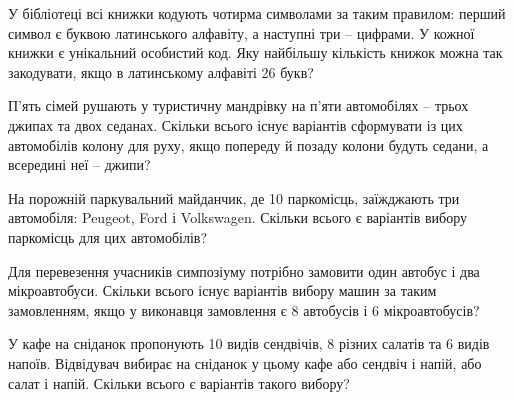 \documentclass[12pt]{article}
\begin{document}
\begin{samepage}
\noindent\zadnum У бібліотеці всі книжки кодують чотирма символами за таким правилом: перший символ є буквою латинського алфавіту, а наступні три – цифрами. У кожної книжки є унікальний особистий код. Яку найбільшу кількість книжок можна так закодувати, якщо в латинському алфавіті 26 букв? 

\nmtnobreak
\nopagebreak\nbvspace{0.5cm}
\nmtAnswerBox
\par{}
\end{samepage}

\begin{samepage}
\noindent\zadnum П'ять сімей рушають у туристичну мандрівку на п'яти автомобілях – трьох джипах та двох седанах. Скільки всього існує варіантів сформувати із цих автомобілів колону для руху, якщо попереду й позаду колони будуть седани, а всередині неї – джипи? 

\nmtnobreak
\nopagebreak\nbvspace{0.5cm}
\nmtAnswerBox
\par{}
\end{samepage}

\begin{samepage}
\noindent\zadnum На порожній паркувальний майданчик, де 10 паркомісць, заїжджають три автомобіля: Peugeot, Ford і Volkswagen. Скільки всього є варіантів вибору паркомісць для цих автомобілів? 

\nmtnobreak
\nopagebreak\nbvspace{0.5cm}
\nmtAnswerBox
\par{}
\end{samepage}

\begin{samepage}
\noindent\zadnum Для перевезення учасників симпозіуму потрібно замовити один автобус і два мікроавтобуси. Скільки всього існує варіантів вибору машин за таким замовленням, якщо у виконавця замовлення є 8 автобусів і 6 мікроавтобусів? 

\nmtnobreak
\nopagebreak\nbvspace{0.5cm}
\nmtAnswerBox
\par{}
\end{samepage}

\begin{samepage}
\noindent\zadnum У кафе на сніданок пропонують 10 видів сендвічів, 8 різних салатів та 6 видів напоїв. Відвідувач вибирає на сніданок у цьому кафе або сендвіч і напій, або салат і напій. Скільки всього є варіантів такого вибору? 

\nmtnobreak
\nopagebreak\nbvspace{0.5cm}
\nmtAnswerBox
\par{}
\end{samepage}
\end{document}
